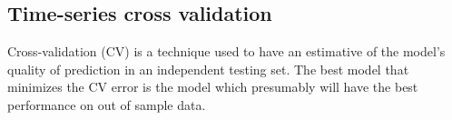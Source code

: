 
\subsection{Time-series cross validation}


Cross-validation (CV) is a technique used to have an estimative of the model's quality of prediction in an independent testing set. The best model that minimizes the CV error is the model which presumably will have the best performance on out of sample data.

